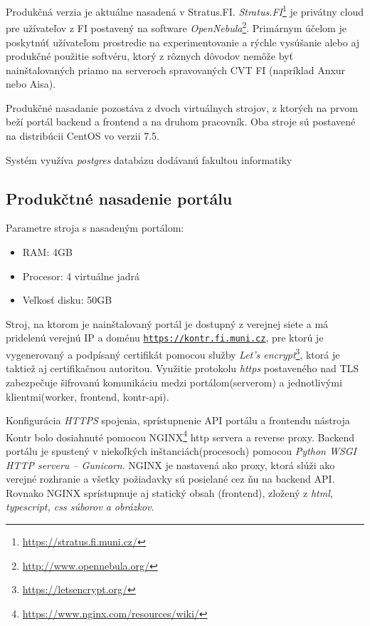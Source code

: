 \documentclass[
  digital, %
  twoside, %
  table,   %
  lof,     %
  lot,     %
]{fithesis3}
\begin{document}
Produkčná verzia je aktuálne nasadená v Stratus.FI. \emph{Stratus.FI}\footnote{\url{https://stratus.fi.muni.cz/}} je privátny cloud pre užívateľov z FI postavený na software \emph{OpenNebula}\footnote{\url{http://www.opennebula.org/}}.
Primárnym účelom je poskytnúť užívateľom prostredie na experimentovanie a rýchle vysúšanie alebo aj produkčné použitie softvéru, ktorý z rôznych dôvodov nemôže byť nainštalovaných priamo na serveroch spravovaných CVT FI (napríklad Anxur nebo Aisa)\cite{fi-tech-stratus}.

Produkčné nasadanie pozostáva z dvoch virtuálnych strojov, z ktorých na prvom beží portál backend a frontend a na druhom pracovník. Oba stroje sú postavené na distribúcii CentOS vo verzii 7.5.

Systém využíva \emph{postgres} databázu dodávanú fakultou informatiky

\subsection{Produkčtné nasadenie portálu}

Parametre stroja s nasadeným portálom:
\begin{itemize}
    \item RAM: 4GB
    \item Procesor: 4 virtuálne jadrá
    \item Veľkosť disku: 50GB
\end{itemize}

Stroj, na ktorom je nainštalovaný portál je dostupný z verejnej siete a má pridelenú verejnú IP a doménu \texttt{\url{https://kontr.fi.muni.cz}}, pre ktorú je vygenerovaný a podpísaný certifikát pomocou služby \emph{Let's encrypt}\footnote{\url{https://letsencrypt.org/}}, ktorá je taktiež aj certifikačnou autoritou. Využitie protokolu \emph{https}\cite{RFC2818} postaveného nad TLS\cite{RFC8446} zabezpečuje šifrovanú komunikáciu medzi portálom(serverom) a jednotlivými klientmi(worker, frontend, kontr-api).

Konfigurácia \emph{HTTPS} spojenia, sprístupnenie API portálu a frontendu nástroja Kontr bolo dosiahnuté pomocou NGINX\footnote{\url{https://www.nginx.com/resources/wiki/}} http servera a reverse proxy. Backend portálu je spustený v niekoľkých inštanciách(procesoch) pomocou \emph{Python WSGI HTTP serveru -- Gunicorn}. NGINX je nastavená ako proxy, ktorá slúži ako verejné rozhranie a všetky požiadavky sú posielané cez ňu na backend API. Rovnako NGINX sprístupnuje aj statický obsah (frontend), zložený z \emph{html, typescript, css súborov a obrázkov}.
\end{document}
